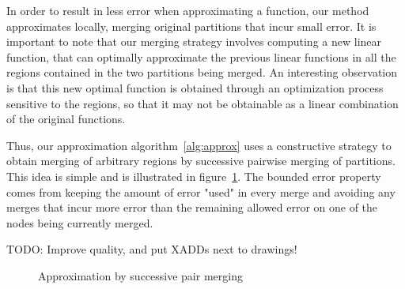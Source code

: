 In order to result in less error when approximating a function, our
method approximates locally, merging original partitions that incur
small error. It is important to note that our merging strategy
involves computing a new linear function, that can optimally
approximate the previous linear functions in all the regions contained
in the two partitions being merged. An interesting observation is that
this new optimal function is obtained through an optimization process
sensitive to the regions, so that it may not be obtainable as a linear
combination of the original functions.

Thus, our approximation algorithm~\ref{alg:approx} uses a constructive strategy to obtain merging of arbitrary regions by successive pairwise merging of partitions. This idea is simple and is illustrated in figure~\ref{fig:steplining}. The bounded error property comes from keeping the amount of error "used" in every merge and avoiding any merges that incur more error than the remaining allowed error on one of the nodes being currently merged.

{\Large TODO: Improve quality, and put XADDs next to drawings!}
\begin{figure}[!ht]
\centering



\caption{ Approximation by successive pair merging}
 \label{fig:steplining}
\end{figure}

